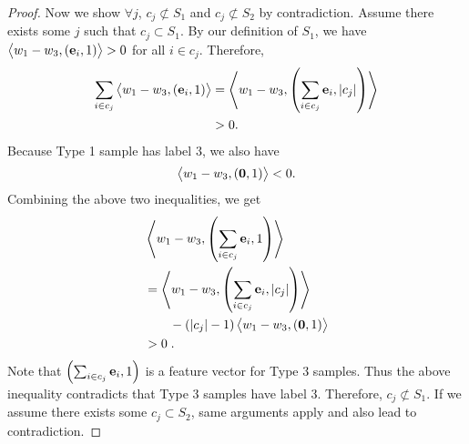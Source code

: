 \begin{proof}
Now we show $\forall j$, $c_j \not\subset S_1$ and $c_j \not\subset S_2$ by
contradiction. Assume there exists some $j$ such that $c_j \subset S_1$. By our
definition of $S_1$, we have $\left\langle w_1-w_3, (\mathbf{e}_i, 1) \right\rangle > 0$ for all $i\in c_j$.
Therefore,
\begin{align*}
\sum_{i\in c_j} \left\langle w_1-w_3, \left(\mathbf{e}_i, 1\right) \right\rangle
& = \left\langle w_1-w_3, \left(\sum_{i\in c_j} \mathbf{e}_i, |c_j|\right) \right\rangle  \\
& > 0.
\end{align*}
Because Type 1 sample has label $3$, we also have
$$
\left\langle w_1-w_3, \left(\mathbf{0}, 1\right) \right\rangle < 0.
$$
Combining the above two inequalities, we get
\begin{align*}
& \left\langle w_1-w_3, \left(\sum_{i\in c_j}\mathbf{e}_i, 1\right) \right\rangle \\
& = \left\langle w_1-w_3, \left(\sum_{i\in c_j}\mathbf{e}_i, |c_j|\right) \right\rangle  \\
& \qquad - (|c_j|-1)\left\langle w_1-w_3, \left(\mathbf{0}, 1\right) \right\rangle \\
& > 0 \; .
\end{align*}
Note that $\left(\sum_{i\in c_j}\mathbf{e}_i, 1\right)$ is a feature vector for Type 3
samples. Thus the above inequality contradicts that Type 3 samples have label 3.
Therefore, $c_j \not\subset S_1$. If we assume there exists some $c_j \subset
S_2$, same arguments apply and also lead to contradiction.
\end{proof}
